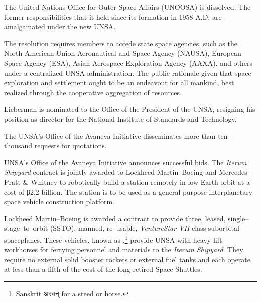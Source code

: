 The United Nations Office for Outer Space Affairs (UNOOSA) is dissolved. The former responsibilities that it held since its formation in 1958 A.D. are amalgamated under the new UNSA.

The resolution requires members to accede state space agencies, such as the North American Union Aeronautical and Space Agency (NAUSA), European Space Agency (ESA), Asian Aerospace Exploration Agency (AAXA), and others under a centralized UNSA administration. The public rationale given that space exploration and settlement ought to be an endeavour for all mankind, best realized through the cooperative aggregation of resources.

Lieberman is nominated to the Office of the President of the UNSA, resigning his position as director for the National Institute of Standards and Technology.
\StopTimelineDate

The UNSA's Office of the Avaneya Initiative disseminates more than ten--thousand requests for quotations.
\StopTimelineDate

UNSA's Office of the Avaneya Initiative announces successful bids. The {\it Iterum Shipyard} contract is jointly awarded to Lockheed Martin--Boeing and Mercedes--Pratt & Whitney to robotically build a station remotely in low Earth orbit at a cost of β2.2 billion. The station is to be used as a general purpose interplanetary space vehicle construction platform.


Lockheed Martin--Boeing is awarded a contract to provide three, leased, single--stage--to--orbit (SSTO), manned, re--usable, {\it VentureStar VII} class suborbital spaceplanes. These vehicles, known as ,\footnote{Sanskrit अरवन् for a steed or horse.} provide UNSA with heavy lift workhorses for ferrying personnel and materials to the {\it Iterum Shipyard}. They require no external solid booster rockets or external fuel tanks and each operate at less than a fifth of the cost of the long retired Space Shuttles.

